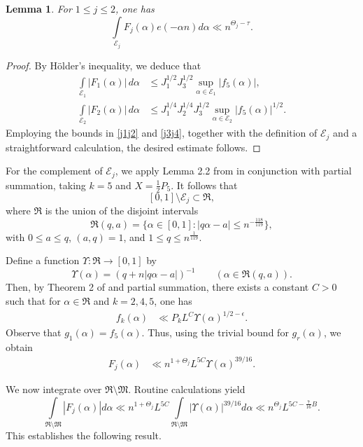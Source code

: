 \documentclass{article}
\theoremstyle{plain}
\newtheorem{lemma}[theorem]{Lemma}
\begin{document}
\begin{lemma}\label{epsilon}
   For $1\leq j \leq 2$, one has 
   $$ \int \limits_{\mathcal{E}_j} F_j(\alpha)e(-\alpha n)d\alpha \ll n^{\Theta_j - \tau}.$$
\end{lemma}

\begin{proof}
    By H\"older’s inequality, we deduce that 
    \begin{align*}
        \int \limits_{\mathcal{E}_1} |F_1(\alpha)|\,d\alpha &\leq J_1^{1/2}J_3^{1/2} \sup \limits_{\alpha \in \mathcal{E}_1}|f_{5}(\alpha)|,\\
        \int \limits_{\mathcal{E}_2} |F_2(\alpha)|\,d\alpha &\leq J_1^{1/4}J_2^{1/4}J_3^{1/2} \sup \limits_{\alpha \in \mathcal{E}_2}|f_{5}(\alpha)|^{1/2}.
    \end{align*}
    Employing the bounds in \eqref{j1j2} and \eqref{j3j4}, together with the definition of $\mathcal{E}_j$ and a straightforward calculation, the desired estimate follows.
\end{proof}


For the complement of $\mathcal{E}_j$, we apply Lemma 2.2 from \cite{KumWoo16} in conjunction with partial summation, taking $k=5$ and $X = \tfrac{1}{2}P_5$. It follows that 
$$[0,1]\setminus \mathcal{E}_j \subset \mathfrak{R},$$
where $\mathfrak{R}$ is the union of the disjoint intervals
$$ \mathfrak{R}(q,a) = \{\alpha \in [0,1]: |q\alpha -a| \leq n^{-\frac{118}{119}}\},$$
with $0\leq a \leq q$, $(a,q)=1$, and $1 \leq q \leq n^{\frac{1}{119}}$. 

Define a function $\Upsilon:\mathfrak{R} \to [0,1]$ by 
$$\Upsilon(\alpha) = (q+n|q\alpha - a|)^{-1} \qquad (\alpha \in \mathfrak{R}(q,a)).$$
Then, by Theorem 2 of \cite{Kum06} and partial summation, there exists a constant $C>0$ such that for $\alpha \in \mathfrak{R}$ and $k=2,4,5$, one has 
\begin{align*}
    f_{k}(\alpha) &\ll P_k L^C\Upsilon(\alpha)^{1/2 - \epsilon}.
\end{align*}
Observe that $g_1(\alpha)=f_5(\alpha)$.
Thus, using the trivial bound for $g_r(\alpha)$, we obtain
\begin{align*}
    F_j(\alpha) &\ll n^{1+\Theta_j}L^{5C}\Upsilon(\alpha)^{39/16}.
\end{align*}

We now integrate over $\mathfrak{R}\setminus \mathfrak{M}$. Routine calculations yield 
$$ \int \limits_{\mathfrak{R}\setminus \mathfrak{M}} |F_j(\alpha)|d\alpha \ll n^{1+\Theta_j}L^{5C}\int \limits_{\mathfrak{R}\setminus \mathfrak{M}} |\Upsilon(\alpha)|^{39/16}d\alpha \ll  n^{\Theta_j}L^{5C-\frac{7}{16}B}.$$
This establishes the following result.
\end{document}
